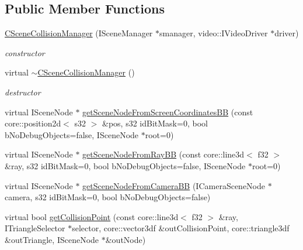 \subsection*{Public Member Functions}
\begin{DoxyCompactItemize}
\item 
\hypertarget{classirr_1_1scene_1_1_c_scene_collision_manager_ab9eee0f687d745a66a8ad975f061beab}{\hyperlink{classirr_1_1scene_1_1_c_scene_collision_manager_ab9eee0f687d745a66a8ad975f061beab}{C\-Scene\-Collision\-Manager} (I\-Scene\-Manager $\ast$smanager, video\-::\-I\-Video\-Driver $\ast$driver)}\label{classirr_1_1scene_1_1_c_scene_collision_manager_ab9eee0f687d745a66a8ad975f061beab}

\begin{DoxyCompactList}\small\item\em constructor \end{DoxyCompactList}\item 
\hypertarget{classirr_1_1scene_1_1_c_scene_collision_manager_a98625afd2b96ddf5b9749ccb6135cc38}{virtual \hyperlink{classirr_1_1scene_1_1_c_scene_collision_manager_a98625afd2b96ddf5b9749ccb6135cc38}{$\sim$\-C\-Scene\-Collision\-Manager} ()}\label{classirr_1_1scene_1_1_c_scene_collision_manager_a98625afd2b96ddf5b9749ccb6135cc38}

\begin{DoxyCompactList}\small\item\em destructor \end{DoxyCompactList}\item 
virtual I\-Scene\-Node $\ast$ \hyperlink{classirr_1_1scene_1_1_c_scene_collision_manager_a21333f7cb9dccf867276972863f0f86e}{get\-Scene\-Node\-From\-Screen\-Coordinates\-B\-B} (const core\-::position2d$<$ s32 $>$ \&pos, s32 id\-Bit\-Mask=0, bool b\-No\-Debug\-Objects=false, I\-Scene\-Node $\ast$root=0)
\item 
virtual I\-Scene\-Node $\ast$ \hyperlink{classirr_1_1scene_1_1_c_scene_collision_manager_a67f6dd80095287c0e2d73579d5237862}{get\-Scene\-Node\-From\-Ray\-B\-B} (const core\-::line3d$<$ f32 $>$ \&ray, s32 id\-Bit\-Mask=0, bool b\-No\-Debug\-Objects=false, I\-Scene\-Node $\ast$root=0)
\item 
virtual I\-Scene\-Node $\ast$ \hyperlink{classirr_1_1scene_1_1_c_scene_collision_manager_a43e829fa1400a6f76bc871032e04a90a}{get\-Scene\-Node\-From\-Camera\-B\-B} (I\-Camera\-Scene\-Node $\ast$camera, s32 id\-Bit\-Mask=0, bool b\-No\-Debug\-Objects=false)
\item 
\hypertarget{classirr_1_1scene_1_1_c_scene_collision_manager_a94a7495473c884501b1815dcfc2f88cb}{virtual bool \hyperlink{classirr_1_1scene_1_1_c_scene_collision_manager_a94a7495473c884501b1815dcfc2f88cb}{get\-Collision\-Point} (const core\-::line3d$<$ f32 $>$ \&ray, I\-Triangle\-Selector $\ast$selector, core\-::vector3df \&out\-Collision\-Point, core\-::triangle3df \&out\-Triangle, I\-Scene\-Node $\ast$\&out\-Node)}\label{classirr_1_1scene_1_1_c_scene_collision_manager_a94a7495473c884501b1815dcfc2f88cb}


\end{DoxyCompactItemize}
